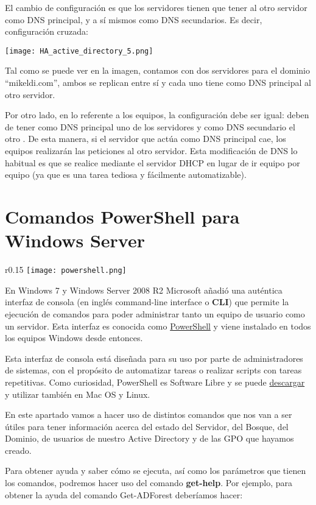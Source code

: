 El cambio de configuración es que los servidores tienen que tener al otro servidor como DNS principal, y a sí mismos como DNS secundarios. Es decir, configuración cruzada:

\begin{center}
    \vspace{-10pt}
    \texttt{[image: HA\_active\_directory\_5.png]}
\end{center}

Tal como se puede ver en la imagen, contamos con dos servidores para el dominio “mikeldi.com”, ambos se replican entre sí y cada uno tiene como DNS principal al otro servidor.

Por otro lado, en lo referente a los equipos, la configuración debe ser igual: deben de tener como DNS principal uno de los servidores y como DNS secundario el otro . De esta manera, si el servidor que actúa como DNS principal cae, los equipos realizarán las peticiones al otro servidor. Esta modificación de DNS lo habitual es que se realice mediante el servidor DHCP en lugar de ir equipo por equipo (ya que es una tarea tediosa y fácilmente automatizable).


\chapter{Comandos PowerShell para Windows Server}
\begin{wrapfigure}{r}{0.15\linewidth}
    \centering
    \vspace{-20pt}
    \texttt{[image: powershell.png]}
\end{wrapfigure}
En Windows 7 y Windows Server 2008 R2 Microsoft añadió una auténtica  interfaz de consola (en inglés command-line interface o \textbf{CLI}) que permite la ejecución de comandos para poder administrar tanto un equipo de usuario como un servidor. Esta interfaz es conocida como \href{https://en.wikipedia.org/wiki/PowerShell}{PowerShell} y viene instalado en todos los equipos  Windows desde entonces.

Esta interfaz de consola está diseñada para su uso por parte de administradores de sistemas, con el propósito de automatizar tareas o realizar scripts con tareas repetitivas. Como curiosidad, PowerShell es Software Libre y se puede \href{https://github.com/PowerShell/PowerShell}{descargar} y utilizar también en Mac OS y Linux.

En este apartado vamos a hacer uso de  distintos comandos que nos van a ser útiles para tener información acerca del estado del Servidor, del Bosque, del Dominio, de usuarios de nuestro Active Directory y de las GPO que hayamos creado.

Para obtener ayuda y saber cómo se ejecuta, así como los parámetros que tienen los comandos, podremos hacer uso del comando \textbf{get-help}. Por ejemplo, para obtener la ayuda del comando Get-ADForest deberíamos hacer:
